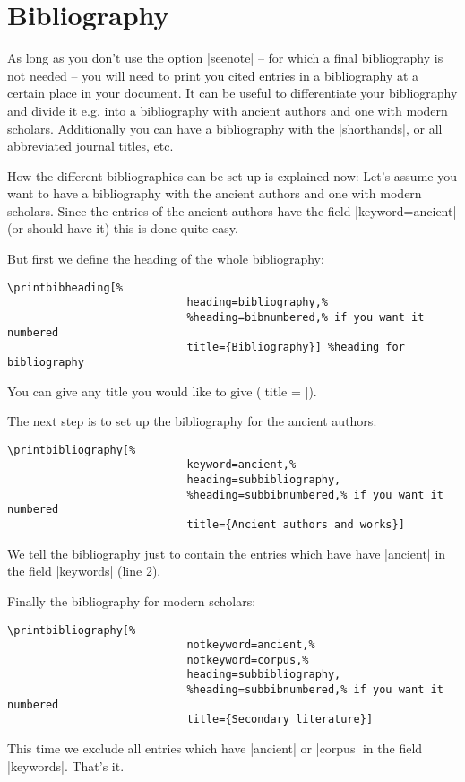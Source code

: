 \documentclass[a4paper,
10pt,
greek,
french,
spanish,
italian,
ngerman,
english
]{ltxdoc}
\begin{document}
	


\newpage
 \section{Bibliography}\label{bibliographie}
 \DescribeMacro{\printbibliography}
As long as you don’t use the option |seenote| -- for which a final bibliography is not needed -- you will need to print you cited entries in a bibliography at a certain place in your document.
It can be useful to differentiate your bibliography and divide it e.g. into a bibliography with ancient authors  and one with modern scholars.
Additionally you can have a bibliography with the |shorthands|, or all abbreviated journal titles, etc.

How the different bibliographies can be set up is explained now:
Let’s assume you want to have a bibliography with the ancient authors and one with modern scholars.
Since the entries of the ancient authors have the field  |keyword={ancient}| (or should have it) this is done quite easy.

But first we define the heading of the whole  bibliography:
\begin{lstlisting}
\printbibheading[%
							heading=bibliography,%
							%heading=bibnumbered,% if you want it numbered
							title={Bibliography}] %heading for bibliography
\end{lstlisting}
You can give any title you would like to give (|title = |).

The next step is to set up the bibliography for the ancient authors.

\begin{lstlisting}
\printbibliography[%
							keyword=ancient,%
							heading=subbibliography,
							%heading=subbibnumbered,% if you want it numbered
							title={Ancient authors and works}]
\end{lstlisting}
We tell the bibliography just to contain the entries which have have |ancient| in the field |keywords| (line 2).


Finally the bibliography for modern scholars:
\begin{lstlisting}
\printbibliography[%
							notkeyword=ancient,%
							notkeyword=corpus,%
							heading=subbibliography,
							%heading=subbibnumbered,% if you want it numbered
							title={Secondary literature}]
\end{lstlisting}
This time we exclude all entries which have |ancient| or |corpus| in the field |keywords|.
That’s it.
\end{document}

